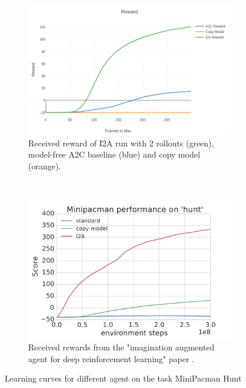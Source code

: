\begin{figure}[H] 
    \centering
    \begin{subfigure}[b]{0.45\textwidth}
        \includegraphics[width=\textwidth]{./Images/hunt_rewards_compare.png}
  		\caption{Received reward of I2A run with 2 rollouts (green), model-free A2C baseline (blue) and copy model (orange).} 
  		\label{fig:mini_pacman_hunt_rewards} 
    \end{subfigure}
	~ %
    \begin{subfigure}[b]{0.45\textwidth}
         \includegraphics[width=\textwidth]{./Images/minipacman_ghosthunt.pdf}
		 \caption{Received rewards from the "imagination augmented agent for deep reinforcement learning" paper \cite{I2A}.} 
		\label{fig:mini_pacman_hunt_original_rewards} 
    \end{subfigure}
    
    \caption{Learning curves for different agent on the task MiniPacman Hunt}\label{fig:mini_pacman_hunt}
\end{figure}

